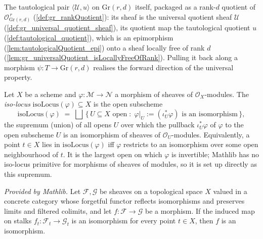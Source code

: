 \begin{definition}
  \label{def:gr_tautologicalRankQuotient}
  The tautological pair \(\langle \mathcal{U}, u\rangle\) on \(\mathrm{Gr}(r,d)\) itself,
  packaged as a rank-\(d\) quotient of \(\mathcal{O}_{\mathrm{Gr}(r,d)}^{\,r}\)
  (\cref{def:gr_rankQuotient}): its sheaf is the universal quotient sheaf \(\mathcal{U}\)
  (\cref{def:gr_universal_quotient_sheaf}), its quotient map the tautological quotient
  \(u\) (\cref{def:tautological_quotient}), which is an epimorphism
  (\cref{lem:tautologicalQuotient_epi}) onto a sheaf locally free of rank \(d\)
  (\cref{lem:gr_universalQuotient_isLocallyFreeOfRank}). Pulling it back along a morphism
  \(\psi : T \to \mathrm{Gr}(r,d)\) realises the forward direction of the universal
  property.
\end{definition}

\begin{definition}
  \label{def:isoLocus}
  Let \(X\) be a scheme and \(\varphi : \mathcal{M} \to \mathcal{N}\) a morphism of sheaves
  of \(\mathcal{O}_X\)-modules. The \emph{iso-locus} \(\mathrm{isoLocus}(\varphi) \subseteq X\)
  is the open subscheme
  \[
    \mathrm{isoLocus}(\varphi)
      \;=\; \bigsqcup\,\bigl\{\, U \subseteq X \text{ open} \;:\;
        \varphi|_U := (\iota_U^{*}\varphi) \text{ is an isomorphism} \,\bigr\},
  \]
  the supremum (union) of all opens \(U\) over which the pullback \(\iota_U^{*}\varphi\) of
  \(\varphi\) to the open subscheme \(U\) is an isomorphism of sheaves of
  \(\mathcal{O}_U\)-modules. Equivalently, a point \(t \in X\) lies in
  \(\mathrm{isoLocus}(\varphi)\) iff \(\varphi\) restricts to an isomorphism over some open
  neighbourhood of \(t\). It is the largest open on which \(\varphi\) is invertible; Mathlib
  has no iso-locus primitive for morphisms of sheaves of modules, so it is set up directly
  as this supremum.
\end{definition}

\begin{lemma}
  \label{lem:isIso_of_stalkFunctor_map_iso_mathlib}
  \mathlibok
  \textit{Provided by Mathlib.}
  Let \(\mathcal{F}, \mathcal{G}\) be sheaves on a topological space \(X\) valued in a
  concrete category whose forgetful functor reflects isomorphisms and preserves limits and
  filtered colimits, and let \(f : \mathcal{F} \to \mathcal{G}\) be a morphism. If the
  induced map on stalks \(f_t : \mathcal{F}_t \to \mathcal{G}_t\) is an isomorphism for every
  point \(t \in X\), then \(f\) is an isomorphism.
\end{lemma}

